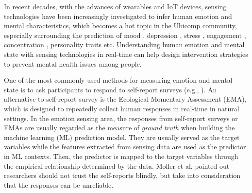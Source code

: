 \documentclass[sigconf]{acmart}
\begin{document}
In recent decades, with the advances of wearables and IoT devices, sensing technologies have been increasingly investigated to infer human emotion and mental characteristics, which becomes a hot topic in the Ubicomp community, especially surrounding the prediction of mood \cite{Moodexplorer,morshed2019prediction}, depression \cite{wang2018trackingdepression,xu2019leveragingdepression}, stress \cite{king2019microstress}, engagement \cite{gao2020n,huynh2018engagemon,di2018engagement}, concentration \cite{rahaman2020ambient}, personality traits \cite{personalitysensing2018wang,gao2019predicting} etc. Understanding human emotion and mental state with sensing technologies in real-time can help design intervention strategies to prevent mental health issues among people. 

One of the most commonly used methods for measuring emotion and mental state is to ask participants to respond to self-report surveys (e.g., \cite{ gao2019predicting,di2018engagement,gashi2019using}). An alternative to self-report survey is the Ecological Momentary Assessment (EMA), which is designed to repeatedly collect human responses in real-time in natural settings. In the emotion sensing area, the responses from self-report surveys or EMAs are usually regarded as the measure of \textit{ground truth} \cite{king2019microstress,di2018engagement,gao2020n,wang2014studentlife,Moodexplorer} when building the machine learning (ML) prediction model. They are usually served as the target variables while the features extracted from sensing data are used as the predictor in ML contexts. Then, the predictor is mapped to the target variables through the empirical relationship determined by the data. Moller et al. \cite{moller2013investigating} pointed out researchers should not trust the self-reports blindly, but take into consideration that the responses can be unreliable.





\end{document}
